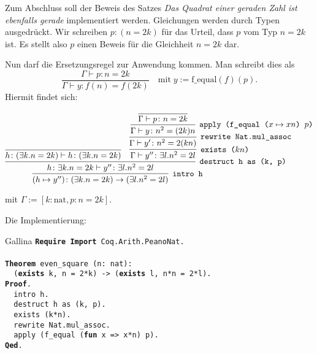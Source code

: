 \documentclass[8pt]{beamer}
\newcommand{\parspace}{\vspace{0.8em}}
\newcommand{\kw}[1]{\textbf{#1}}
\begin{document}
\begin{frame}
Zum Abschluss soll der Beweis des Satzes
\emph{Das Quadrat einer geraden Zahl ist ebenfalls gerade}
implementiert werden. Gleichungen werden durch Typen ausgedrückt.
Wir schreiben $p\colon (n = 2k)$ für das Urteil, dass $p$ vom Typ
$n = 2k$ ist. Es stellt also $p$ einen Beweis für die Gleichheit
$n = 2k$ dar.\pause

\parspace
Nun darf die Ersetzungsregel zur Anwendung kommen. Man schreibt dies als
\[\dfrac{\Gamma\vdash p\colon n = 2k}{\Gamma\vdash y\colon f(n) = f(2k)}
\quad\text{mit}\;y:=\mathrm{f\_equal}(f)(p).\]\pause
Hiermit findet sich:
\begin{small}
\[
\infer[\texttt{intro h}]{(h\mapsto y'')\colon(\exists k. n = 2k)\to (\exists l. n^2 = 2l)}{
  \infer[\texttt{destruct h as (k, p)}]{h\colon\exists k. n = 2k\vdash y''\colon\exists l. n^2 = 2l}{
    \infer{h\colon (\exists k. n = 2k)\vdash h\colon (\exists k. n = 2k)}{}
  & \infer[\texttt{exists ($kn$)}]{\Gamma\vdash y''\colon\exists l. n^2 = 2l}{
      \infer[\texttt{rewrite Nat.mul\_assoc}]{\Gamma\vdash y'\colon n^2 = 2(kn)}{
        \infer[\texttt{apply (f\_equal ($x\mapsto xn$) $p$)}]{\Gamma\vdash y\colon n^2 = (2k)n}{
          \infer{\Gamma\vdash p\colon n = 2k}{}}}}}}
\]
\end{small}
mit $\Gamma:=[k\colon\mathrm{nat}, p\colon n = 2k]$.
\end{frame}

\begin{frame}
Die Implementierung:
\begin{block}{Gallina}
\texttt{\kw{Require} \kw{Import} Coq.Arith.PeanoNat.\\
\mbox{}\\
\kw{Theorem} even\_square (n: nat):\\
\ \ (\kw{exists} k, n = 2*k) -> (\kw{exists} l, n*n = 2*l).\\
\kw{Proof}.\\
\ \ intro h.\\
\ \ destruct h as (k, p).\\
\ \ exists (k*n).\\
\ \ rewrite Nat.mul\_assoc.\\
\ \ apply (f\_equal (\kw{fun} x => x*n) p).\\
\kw{Qed}.}
\end{block}
\end{frame}
\end{document}
